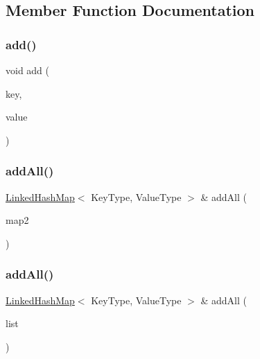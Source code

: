 \subsection{Member Function Documentation}
\mbox{\label{classLinkedHashMap_a9129d6095063e7e14d85c627d35086a5}} 
\subsubsection{\texorpdfstring{add()}{add()}}
{\footnotesize\ttfamily void add (\begin{DoxyParamCaption}\item[{const Key\+Type \&}]{key,  }\item[{const Value\+Type \&}]{value }\end{DoxyParamCaption})}

\mbox{\label{classLinkedHashMap_a9e6cd6e8273810ac99a612cdf14f084c}} 
\subsubsection{\texorpdfstring{add\+All()}{addAll()}\hspace{0.1cm}{\footnotesize\ttfamily [1/2]}}
{\footnotesize\ttfamily \mbox{\hyperlink{classLinkedHashMap}{Linked\+Hash\+Map}}$<$ Key\+Type, Value\+Type $>$ \& add\+All (\begin{DoxyParamCaption}\item[{const \mbox{\hyperlink{classLinkedHashMap}{Linked\+Hash\+Map}}$<$ Key\+Type, Value\+Type $>$ \&}]{map2 }\end{DoxyParamCaption})}

\mbox{\label{classLinkedHashMap_a978384e74cf368abfc3971c76c08a8df}} 
\subsubsection{\texorpdfstring{add\+All()}{addAll()}\hspace{0.1cm}{\footnotesize\ttfamily [2/2]}}
{\footnotesize\ttfamily \mbox{\hyperlink{classLinkedHashMap}{Linked\+Hash\+Map}}$<$ Key\+Type, Value\+Type $>$ \& add\+All (\begin{DoxyParamCaption}\item[{std\+::initializer\+\_\+list$<$ std\+::pair$<$ Key\+Type, Value\+Type $>$ $>$}]{list }\end{DoxyParamCaption})}


